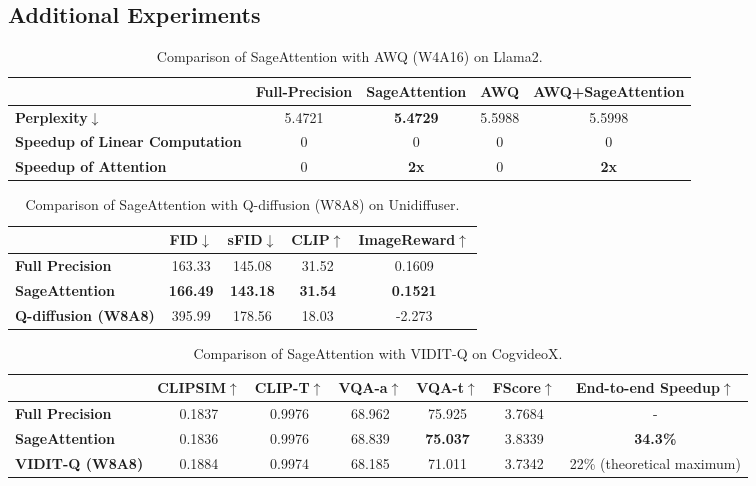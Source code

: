 \subsection{Additional Experiments} \label{sec:append_add_exp}


\begin{table}[h!]
\caption{Comparison of SageAttention with AWQ (W4A16) on Llama2.}
\label{tab:comp_awq}
\setlength\tabcolsep{2pt}
\centering
\begin{tabular}{l|c|c|c|c}
\toprule
 & Full-Precision & SageAttention & AWQ & AWQ+SageAttention \\
\hline
\textbf{Perplexity}$\downarrow$ & 5.4721 & \textbf{5.4729} & 5.5988 & 5.5998 \\
\textbf{Speedup of Linear Computation} & 0 & 0 & 0 & 0 \\
\textbf{Speedup of Attention} & 0 & \textbf{2x} & 0 & \textbf{2x} \\
\bottomrule
\end{tabular}
\end{table}

\begin{table}[h!]
\caption{Comparison of SageAttention with Q-diffusion (W8A8) on Unidiffuser.}
\label{tab:comp_qdiffusion}
\setlength\tabcolsep{15pt}
\centering
\begin{tabular}{l|c|c|c|c}
\toprule
 & FID$\downarrow$ & sFID$\downarrow$ & CLIP$\uparrow$ & ImageReward$\uparrow$ \\
\hline
\textbf{Full Precision} & 163.33 & 145.08 & 31.52 & 0.1609 \\
\textbf{SageAttention} & \textbf{166.49} & \textbf{143.18} & \textbf{31.54} & \textbf{0.1521} \\
\textbf{Q-diffusion (W8A8)} & 395.99 & 178.56 & 18.03 & -2.273 \\
\bottomrule
\end{tabular}
\end{table}

\begin{table}[h!]
\caption{Comparison of SageAttention with VIDIT-Q on CogvideoX.}
\label{tab:comp_viditq}
\setlength\tabcolsep{1.2pt}
\centering
\begin{tabular}{l|c|c|c|c|c|c}
\toprule
 & CLIPSIM$\uparrow$ & CLIP-T$\uparrow$ & VQA-a$\uparrow$ & VQA-t$\uparrow$ & FScore$\uparrow$ & End-to-end Speedup$\uparrow$ \\
\hline
\textbf{Full Precision} & 0.1837 & 0.9976 & 68.962 & 75.925 & 3.7684 & - \\
\textbf{SageAttention} & 0.1836 & 0.9976 & 68.839 & \textbf{75.037} & 3.8339 & \textbf{34.3\%} \\
\textbf{VIDIT-Q (W8A8)} & 0.1884 & 0.9974 & 68.185 & 71.011 & 3.7342 & 22\% (theoretical maximum) \\
\bottomrule
\end{tabular}
\end{table}


